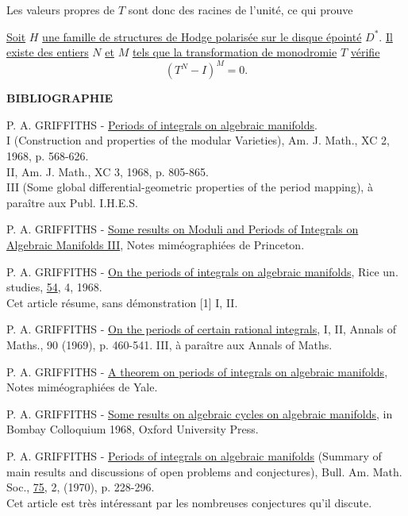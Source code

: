 \documentclass[10pt,leqno]{article}
\theoremstyle{deligne}
\renewcommand{\underline}[1]{\uline{#1}}
\begin{document}
Les valeurs propres de $T$ sont donc des racines de l'unité, ce qui prouve

\begin{theoremeMonodromie}[6.5 (A. Borel)]
\underline{Soit} $H$ \underline{une famille de structures de Hodge polarisée sur le disque épointé} $D^*$. \underline{Il existe des entiers} $N$ \underline{et} $M$ \underline{tels que la transformation de monodromie} $T$ \underline{vérifie}
\[
  (T^N-I)^M=0.
\]
\end{theoremeMonodromie}

\begin{center}
\bfseries BIBLIOGRAPHIE
\end{center}

\begin{enumerate}[label={[\arabic*]},leftmargin=2.8em]
\item P. A. GRIFFITHS - \uline{Periods of integrals on algebraic manifolds}.\\
I (Construction and properties of the modular Varieties), Am. J. Math., XC 2, 1968, p. 568-626.\\
II, Am. J. Math., XC 3, 1968, p. 805-865.\\
III (Some global differential-geometric properties of the period mapping), à paraître aux Publ. I.H.E.S.

\item P. A. GRIFFITHS - \uline{Some results on Moduli and Periods of Integrals on Algebraic Manifolds III}, Notes miméographiées de Princeton.

\item P. A. GRIFFITHS - \uline{On the periods of integrals on algebraic manifolds}, Rice un. studies, \uline{54}, 4, 1968.\\
Cet article résume, sans démonstration [1] I, II.

\item P. A. GRIFFITHS - \uline{On the periods of certain rational integrals}, I, II, Annals of Maths., 90 (1969), p. 460-541. III, à paraître aux Annals of Maths.

\item P. A. GRIFFITHS - \uline{A theorem on periods of integrals on algebraic manifolds}, Notes miméographiées de Yale.

\item P. A. GRIFFITHS - \uline{Some results on algebraic cycles on algebraic manifolds}, in Bombay Colloquium 1968, Oxford University Press.

\item P. A. GRIFFITHS - \uline{Periods of integrals on algebraic manifolds} (Summary of main results and discussions of open problems and conjectures), Bull. Am. Math. Soc., \uline{75}, 2, (1970), p. 228-296.\\
Cet article est très intéressant par les nombreuses conjectures qu'il discute.


\end{enumerate}
\end{document}
